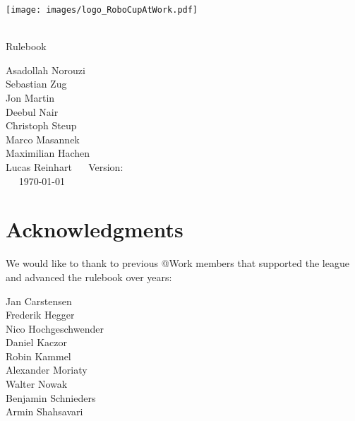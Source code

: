 
\begin{titlepage}
  \begin{center}
    {

      \texttt{[image: images/logo\_RoboCupAtWork.pdf]}\\[1.23ex]
    }
    \vspace{2.7 cm}
    \hrulefill\par
    {%
      \vspace*{.27cm}
      \Huge{\RCAW}\\[1.23ex]
      \Large Rulebook \\[2ex]
    }

    \hrulefill\par


    \vfill
    Asadollah Norouzi\\
  	Sebastian Zug\\
    Jon Martin \\
    Deebul Nair \\
    Christoph Steup \\
    Marco Masannek\\
    Maximilian Hachen\\
    Lucas Reinhart
    \vfill
    ~~ Version: \YEAR ~~ \\
    ~~  \today ~~ \\
  \end{center}

\newpage

\section*{Acknowledgments}

We would like to thank to previous @Work members that supported the league and
advanced the rulebook over years:

Jan Carstensen \\
Frederik Hegger\\
Nico Hochgeschwender \\
Daniel Kaczor \\
Robin Kammel \\
Alexander Moriaty \\
Walter Nowak \\
Benjamin Schnieders\\
Armin Shahsavari \\


\end{titlepage}

